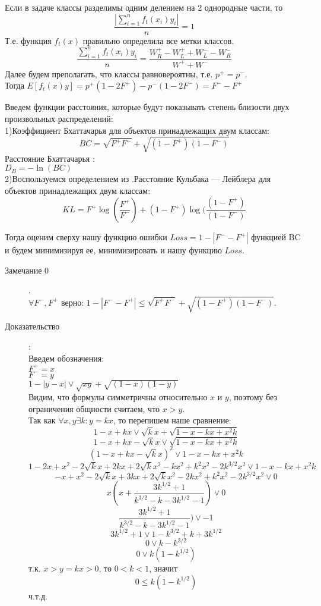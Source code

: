 \documentclass[12 pt, russian]{article}
\begin{document}
 Если в задаче классы разделимы одним делением на 2 однородные части, то $$\dfrac{|\sum\limits_{i=1}^{n}f_t(x_i)y_i|}{n} = 1$$
 Т.е. функция $f_t(x)$ правильно определила все метки классов.\\

  $$\dfrac{\sum\limits_{i=1}^{n}f_t(x_i)y_i}{n} = \dfrac{W^+_R-W^+_L+W^-_L-W^-_R}{W^++W^-}$$
 Далее будем преполагать, что классы равновероятны, т.е. $p^+=p^-$.\\
 Тогда $ E[f_t(x)y] = p^+(1-2F^+) - p^-(1-2F^-) = F^- - F^+$

Введем функции расстояния, которые будут показывать степень близости двух произвольных распределений:\\
1)Коэффициент Бхаттачарья для объектов принадлежащих двум классам: 
 $$BC = \sqrt{F^+F^-}+\sqrt{(1-F^+)(1-F^-)}$$
Расстояние Бхаттачарья :\\
$D_B = -\ln(BC)$\\
2)Воспользуемся определением из \cite{kl}.Расстояние Кульбака — Лейблера для объектов принадлежащих двум классам:
	$$KL =   F^+\log(\frac{F^+}{F^-}) + (1-F^+)\log(\frac{(1-F^+)}{(1-F^-)}$$
    
Тогда оценим сверху нашу функцию ошибки $Loss = 1-|F^- - F^+|$ функцией BC и будем минимизируя ее, минимизировать и нашу функцию $Loss$.\

\begin{description}
\item[Замечание 0].\\
$\forall F^-,F^+$ верно: $1-|F^- - F^+| \leq \sqrt{F^+F^-}+\sqrt{(1-F^+)(1-F^-)}$.\\
\item[Доказательство]:\\
Введем обозначения:\\
$F^+ = x$\\
$F^- = y$\\
$1-|y - x| \vee \sqrt{xy}+\sqrt{(1-x)(1-y)}$\\
Видим, что формулы симметричны относительно $x$ и $y$, поэтому без ограничения общности считаем, что $x>y$.\\
Так как $\forall x,y \exists k: y = kx$, то перепишем наше сравнение:\\
$$1-x +kx \vee \sqrt{k}x+\sqrt{1-x-kx+x^2k}$$
$$1-x +kx - \sqrt{k}x \vee \sqrt{1-x-kx+x^2k}$$
$$(1-x +kx - \sqrt{k}x)^2 \vee 1-x-kx+x^2k$$
$$1-2x +x^2 - 2\sqrt{k}x+2kx+2\sqrt{k}x^2-kx^2+k^2x^2-2k^{3/2}x^2 \vee 1-x-kx+x^2k$$
$$-x +x^2 - 2\sqrt{k}x+3kx+2\sqrt{k}x^2-2kx^2+k^2x^2-2k^{3/2}x^2 \vee 0$$
$$x(x+ \dfrac{3k^{1/2}+1}{k^{3/2}-k-3k^{1/2}-1}) \vee 0$$
$$\dfrac{3k^{1/2}+1}{k^{3/2}-k-3k^{1/2}-1}) \vee -1$$
$$3k^{1/2}+1 \vee 1-k^{3/2}+k+3k^{1/2}$$
$$0 \vee k-k^{3/2}$$
$$0 \vee k(1-k^{1/2})$$
т.к. $x>y = kx>0$, то $0<k<1$, значит
$$0 \leq k(1-k^{1/2})$$
ч.т.д.
\end{description}
\end{document}
